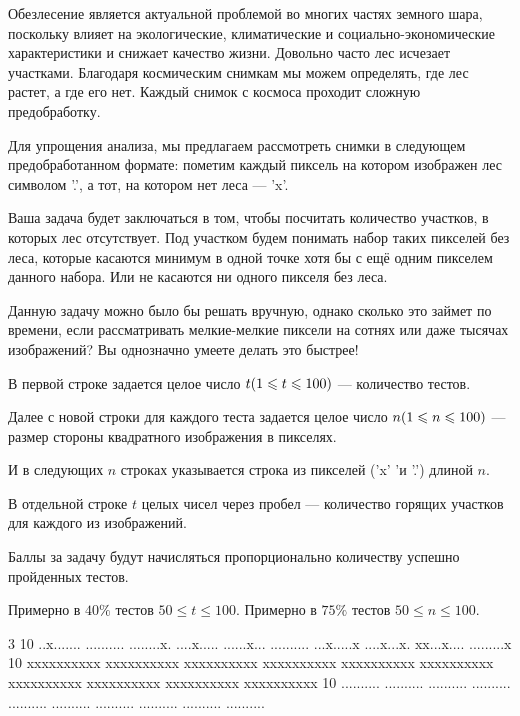 
Обезлесение является актуальной проблемой во многих частях земного шара, поскольку влияет на 
экологические, климатические и социально-экономические характеристики и снижает качество жизни. 
Довольно часто лес исчезает участками. Благодаря космическим снимкам мы можем определять, 
где лес растет, а где его нет. Каждый снимок с космоса проходит сложную предобработку. 

Для упрощения анализа, мы предлагаем рассмотреть снимки в следующем предобработанном формате: 
пометим каждый пиксель на котором изображен лес символом '.', а тот, на котором нет леса — 'x'.

Ваша задача будет заключаться в том, чтобы посчитать количество участков, в которых лес отсутствует. 
Под участком будем понимать набор таких пикселей без леса, которые касаются минимум в одной точке хотя 
бы с ещё одним пикселем данного набора. Или не касаются ни одного пикселя без леса.

Данную задачу можно было бы решать вручную, однако сколько это займет по времени, если рассматривать 
мелкие-мелкие пиксели на сотнях или даже тысячах изображений? Вы однозначно умеете делать это быстрее!


В первой строке задается целое число $t \space (1 \leq t \leq 100)$  — количество тестов.

Далее с новой строки для каждого теста задается целое число $n\space (1 \leq n \leq 100)$  — размер стороны 
квадратного изображения в пикселях.

И в следующих $n$ строках указывается строка из пикселей ('x' 'и '.') длиной $n$.

\outputfmtSection

В отдельной строке $ t $ целых чисел через пробел — количество горящих участков для каждого из изображений.

\markSection

Баллы за задачу будут начисляться пропорционально количеству успешно пройденных тестов.

Примерно в $40\%$  тестов $50 \leq t \leq 100$.  
Примерно в $75\%$  тестов $50 \leq n \leq 100$. 


\begin{myverbbox}[\small]{\vinput}
3
10
..x.......
..........
........x.
....x.....
......x...
..........
...x.....x
....x...x.
xx...x....
.........x
10
xxxxxxxxxx
xxxxxxxxxx
xxxxxxxxxx
xxxxxxxxxx
xxxxxxxxxx
xxxxxxxxxx
xxxxxxxxxx
xxxxxxxxxx
xxxxxxxxxx
xxxxxxxxxx
10
..........
..........
..........
..........
..........
..........
..........
..........
..........
..........
\end{myverbbox}

